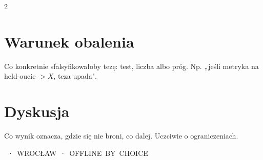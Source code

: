 \begin{multicols}{2}
\section{Warunek obalenia}

Co konkretnie sfalsyfikowałoby tezę: test, liczba albo próg.
Np. „jeśli metryka na held-oucie $>X$, teza upada".\,\corr

\section{Dyskusja}

Co wynik oznacza, gdzie się nie broni, co dalej.
Uczciwie o ograniczeniach.

\vspace{6pt}

\vspace{4pt}
{\fontsize{5.5}{5.5}\selectfont\ttfamily\color{BETON}%
  ~·~WROCŁAW~·~OFFLINE~BY~CHOICE~\slaycross[BETON!60]}

\end{multicols}
